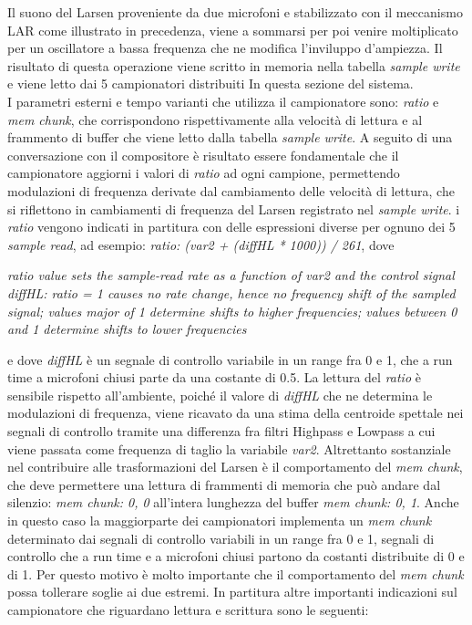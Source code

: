 Il suono del Larsen proveniente da due microfoni e stabilizzato con il meccanismo LAR come 
illustrato in precedenza, viene a sommarsi per poi venire moltiplicato per un oscillatore a bassa frequenza
che ne modifica l'inviluppo d'ampiezza. Il risultato di questa operazione viene scritto in memoria
nella tabella \textit{sample write} e viene letto dai 5 campionatori distribuiti In
questa sezione del sistema. \\
I parametri esterni e tempo varianti che utilizza il campionatore sono: \textit{ratio} e \textit{mem chunk},
che corrispondono rispettivamente alla velocità di lettura e al frammento di buffer che viene letto
dalla tabella \textit{sample write}.
A seguito di una conversazione con il compositore è risultato essere fondamentale che
il campionatore aggiorni i valori di \textit{ratio} ad ogni campione, permettendo modulazioni
di frequenza derivate dal cambiamento delle velocità di lettura,
che si riflettono in cambiamenti di frequenza del Larsen registrato nel \textit{sample write}.
i \textit{ratio} vengono indicati in partitura con delle espressioni diverse per ognuno
dei 5 \textit{sample read}, ad esempio: \textit{ratio: (var2 + (diffHL * 1000)) / 261}, dove 

\begin{center}
    \vspace{0.5cm}
    \textit{ratio value sets the sample-read rate as a function of var2 and the control signal diffHL: ratio = 1 causes no rate
    change, hence no frequency shift of the sampled signal; values major of 1 determine shifts to higher frequencies; values
    between 0 and 1 determine shifts to lower frequencies}
    \vspace{0.5cm}
\end{center}

e dove \textit{diffHL} è un segnale
di controllo variabile in un range fra 0 e 1, che a run time a microfoni chiusi parte da una costante di 0.5.
La lettura del \textit{ratio} è sensibile rispetto all'ambiente, poiché il valore di \textit{diffHL}
che ne determina le modulazioni di frequenza, viene ricavato da una stima della centroide spettale 
nei segnali di controllo tramite una differenza fra filtri Highpass e Lowpass 
a cui viene passata come frequenza di taglio la variabile \textit{var2}.
Altrettanto sostanziale nel contribuire alle trasformazioni del Larsen 
è il comportamento del \textit{mem chunk}, che deve permettere una lettura
di frammenti di memoria che può andare dal silenzio: \textit{mem chunk: 0, 0} all'intera
lunghezza del buffer \textit{mem chunk: 0, 1}.
Anche in questo caso la maggiorparte dei campionatori implementa un \textit{mem chunk} 
determinato dai segnali di controllo variabili in un range fra 0 e 1, 
segnali di controllo che a run time e a microfoni chiusi 
partono da costanti distribuite di 0 e di 1.
Per questo motivo è molto importante che il comportamento del \textit{mem chunk} 
possa tollerare soglie ai due estremi.
In partitura altre importanti indicazioni sul campionatore che riguardano 
lettura e scrittura sono le seguenti:


